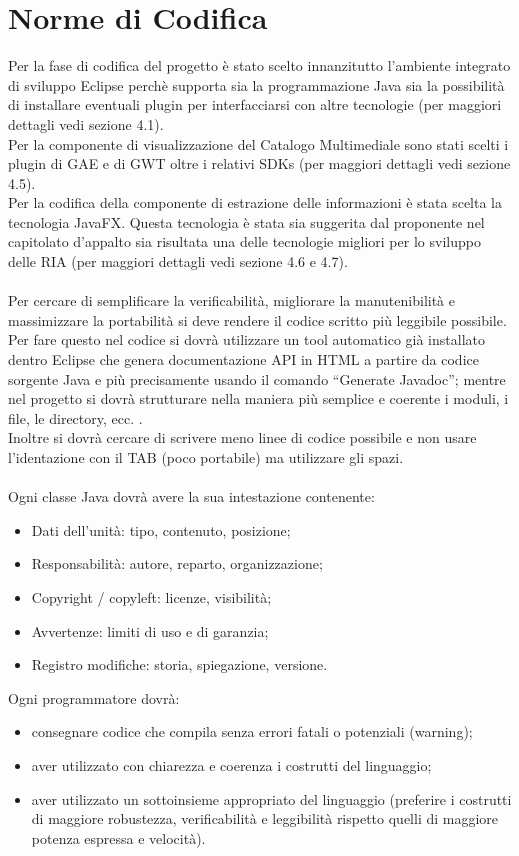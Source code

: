 \chapter{Norme di Codifica}
\thispagestyle{fancy} 
Per la fase di codifica del progetto \`e stato scelto innanzitutto l'ambiente
integrato di sviluppo Eclipse perch\`e supporta sia la programmazione Java
sia la possibilit\`a  di installare eventuali plugin per interfacciarsi con
altre tecnologie (per maggiori dettagli vedi sezione 4.1).\\
Per la componente di visualizzazione del Catalogo
Multimediale sono stati scelti i plugin di GAE e di GWT oltre i relativi SDKs
(per maggiori dettagli vedi sezione 4.5).\\ 
Per la codifica della componente di estrazione delle informazioni \`e stata
scelta la tecnologia JavaFX. Questa tecnologia \`e stata sia suggerita dal
proponente nel capitolato d'appalto sia risultata una delle tecnologie migliori
per lo sviluppo delle RIA (per maggiori dettagli vedi sezione 4.6 e 4.7).
\\ \\
Per cercare di semplificare la verificabilit\`a, migliorare la
manutenibilit\`a e massimizzare la portabilit\`a si deve rendere il codice
scritto pi\`u leggibile possibile.\\
Per fare questo nel codice si dovr\`a utilizzare un tool automatico gi\`a
installato dentro Eclipse che genera documentazione API in HTML a partire da codice sorgente Java
e pi\`u precisamente usando il comando ``Generate Javadoc''; mentre nel progetto
si dovr\`a strutturare nella maniera pi\`u semplice e coerente i moduli, i file,
le directory, ecc. .\\
Inoltre si dovr\`a cercare di scrivere meno linee di codice possibile e non
usare l'identazione con il TAB (poco portabile) ma utilizzare gli spazi.
\\ \\
Ogni classe Java dovr\`a avere la sua intestazione contenente:
\begin{itemize}
  \item {Dati dell'unit\`a: tipo, contenuto, posizione;}
  \item {Responsabilit\`a: autore, reparto, organizzazione;}
  \item {Copyright / copyleft: licenze, visibilit\`a;}
  \item {Avvertenze: limiti di uso e di garanzia;}
  \item {Registro modifiche: storia, spiegazione, versione.} 
\end{itemize}
Ogni programmatore dovr\`a:
\begin{itemize}
  \item{consegnare codice che compila senza errori fatali o
potenziali (warning);} 
  \item{aver utilizzato con chiarezza e coerenza i costrutti del
linguaggio;}
  \item{aver utilizzato un sottoinsieme appropriato del linguaggio
(preferire i costrutti di maggiore robustezza, verificabilit\`a e leggibilit\`a
rispetto quelli di maggiore potenza espressa e velocit\`a).}
\end{itemize}


